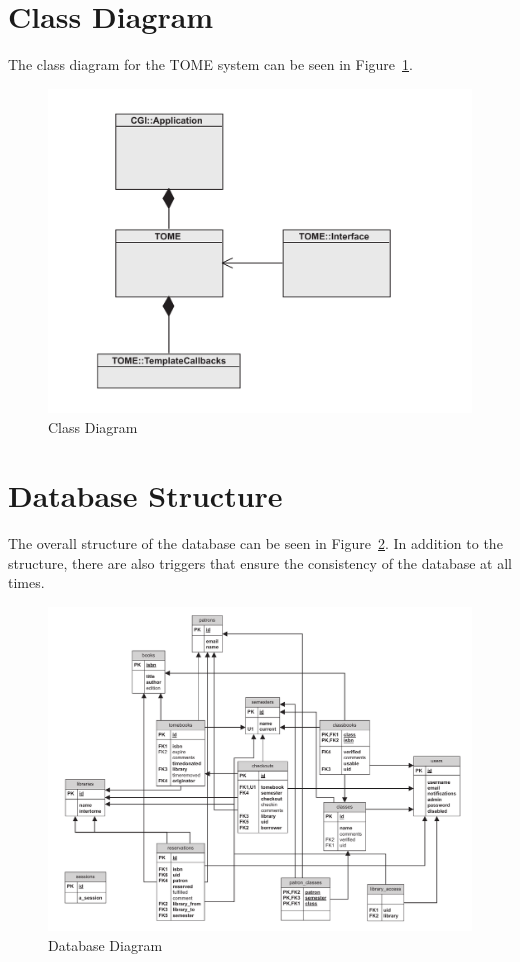 \documentclass[12pt,titlepage]{article}
\begin{document}
\section{Class Diagram}
The class diagram for the TOME system can be seen in Figure~\ref{ComponentDiagram}.
\begin{figure}[h]
	\includegraphics[width=\textwidth]{ComponentDiagram}
	\caption{Class Diagram}
	\label{ComponentDiagram}
\end{figure}


\section{Database Structure}
\label{tomedbsection}
The overall structure of the database can be seen in Figure~\ref{tomedb}.  In addition to the structure, there are also triggers that ensure the consistency of the database at all times.
\begin{figure}[h]
	\includegraphics[width=\textwidth]{tomedb}
	\caption{Database Diagram}
	\label{tomedb}
\end{figure}
\end{document}
